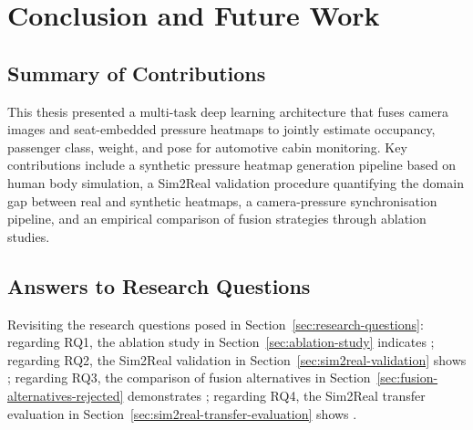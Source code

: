 \chapter{Conclusion and Future Work}
\label{ch:conclusion}

\section{Summary of Contributions}
\label{sec:summary-contributions}
This thesis presented a multi-task deep learning architecture that fuses
camera images and seat-embedded pressure heatmaps to jointly estimate
occupancy, passenger class, weight, and pose for automotive cabin
monitoring. Key contributions include a synthetic pressure heatmap
generation pipeline based on human body simulation, a Sim2Real validation
procedure quantifying the domain gap between real and synthetic heatmaps,
a camera-pressure synchronisation pipeline, and an empirical comparison of
fusion strategies through ablation studies.

\section{Answers to Research Questions}
\label{sec:answers-research-questions}
Revisiting the research questions posed in
Section~\ref{sec:research-questions}: regarding RQ1, the ablation study in
Section~\ref{sec:ablation-study} indicates ; regarding RQ2, the Sim2Real
validation in Section~\ref{sec:sim2real-validation} shows ; regarding RQ3, the
comparison of fusion alternatives in
Section~\ref{sec:fusion-alternatives-rejected} demonstrates ; regarding RQ4, the
Sim2Real transfer evaluation in
Section~\ref{sec:sim2real-transfer-evaluation} shows .

